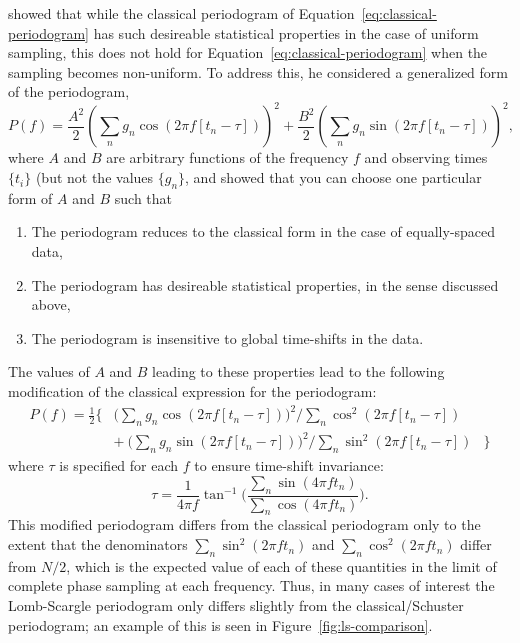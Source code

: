 \documentclass[preprint]{aastex}
\newcommand{\fig}[1]{Figure~\ref{fig:#1}}
\newcommand{\Eq}[1]{Equation~\ref{eq:#1}}
\newcommand{\eq}[1]{\Eq{#1}}
\newcommand{\eqlabel}[1]{\label{eq:#1}}
\begin{document}
\citet{Scargle82} showed that while the classical periodogram of
\eq{classical-periodogram} has such desireable statistical properties
in the case of uniform sampling, this does not hold for
\eq{classical-periodogram} when the sampling becomes non-uniform.
To address this, he considered a generalized form of the periodogram,
\begin{equation}
  P(f) = \frac{A^2}{2}\left(\sum_n g_n \cos(2\pi f [t_n-\tau])\right)^2
       + \frac{B^2}{2} \left(\sum_n g_n \sin(2\pi f [t_n-\tau])\right)^2,
\end{equation}
where $A$ and $B$ are arbitrary functions of the frequency $f$ and
observing times $\{t_i\}$ (but not the values $\{g_n\}$, and showed
that you can choose one particular form of $A$ and $B$ such that
\begin{enumerate}
  \item The periodogram reduces to the classical form in the case of equally-spaced data,
  \item The periodogram has desireable statistical properties, in the sense discussed above,
  \item The periodogram is insensitive to global time-shifts in the data.
\end{enumerate}
The values of $A$ and $B$ leading to these properties lead to the following
modification of the classical expression for the periodogram:
\begin{eqnarray}
  P(f) =
  \frac{1}{2} \Bigg\{ &
  \bigg(\sum_n g_n \cos(2\pi f [t_n-\tau])\bigg)^2 \bigg/
  \sum_n \cos^2(2\pi f [t_n-\tau]) &\nonumber\\
  & + ~ \bigg(\sum_n g_n \sin(2\pi f [t_n-\tau])\bigg)^2 \bigg/
  \sum_n \sin^2(2\pi f [t_n-\tau]) & \Bigg\}
  \eqlabel{lomb-scargle-periodogram}
\end{eqnarray}
where $\tau$ is specified for each $f$ to ensure time-shift invariance:
\begin{equation}
  \tau = \frac{1}{4\pi f}\tan^{-1}\Bigg(
  \frac{\sum_n \sin(4\pi f t_n)}{\sum_n \cos(4\pi f t_n)}\Bigg).
  \eqlabel{tau-def}
\end{equation}
This modified periodogram differs from the classical periodogram only to
the extent that the denominators $\sum_n \sin^2(2\pi f t_n)$ and
$\sum_n \cos^2(2\pi f t_n)$ differ from $N/2$, which is the expected value of
each of these quantities in the limit of complete phase sampling at each
frequency.
Thus, in many cases of interest the Lomb-Scargle periodogram only differs
slightly from the classical/Schuster periodogram; an example of this is seen
in \fig{ls-comparison}.
\end{document}

